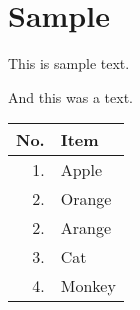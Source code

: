 \documentclass[12pt,a4paper]{article}
\begin{document}
\section{Sample}

This is sample text.

And this was a text.

\begin{tabular}{r|l}

\textbf{No.} & \textbf{Item} \\
\hline

1. & Apple \\
2. & Orange \\
2. & Arange \\
3. & Cat \\
4. & Monkey \\

\end{tabular}
\end{document}
